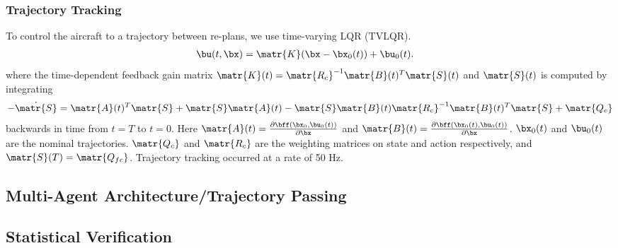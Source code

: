 \subsubsection{Trajectory Tracking}
To control the aircraft to a trajectory between re-plans, we use time-varying LQR (TVLQR).
\begin{align}
\bu(t,\bx) &= \matr{K}(\bx-\bx_0(t))+\bu_{0}(t).
\end{align}
where the time-dependent feedback gain matrix $\matr{K}(t) = \matr{R_c}^{-1}\matr{B}(t)^T\matr{S}(t)$
and $\matr{S}(t)$ is computed by integrating
\begin{align}
-\dot{\matr{S}} = \matr{A}(t)^T\matr{S}+\matr{S}\matr{A}(t)-\matr{S}\matr{B}(t)\matr{R_c}^{-1}\matr{B}(t)^T\matr{S}+\matr{Q_c}
\end{align}
backwards in time from $t=T$ to $t=0$. Here $\matr{A}(t)=\frac{\partial \bff(\bx_0,\bu_0(t))}{\partial \bx}$ and $\matr{B}(t)=\frac{\partial \bff(\bx_0(t),\bu_0(t))}{\partial \bx}$. $\bx_{0}(t)$ and $\bu_{0}(t)$ are the nominal trajectories. $\matr{Q_c}$ and $\matr{R_c}$ are the weighting matrices on state and action respectively, and $\matr{S}(T)=\matr{Q_{fc}}$. Trajectory tracking occurred at a rate of 50 Hz. 

\subsection{Multi-Agent Architecture/Trajectory Passing}
\subsection{Statistical Verification}